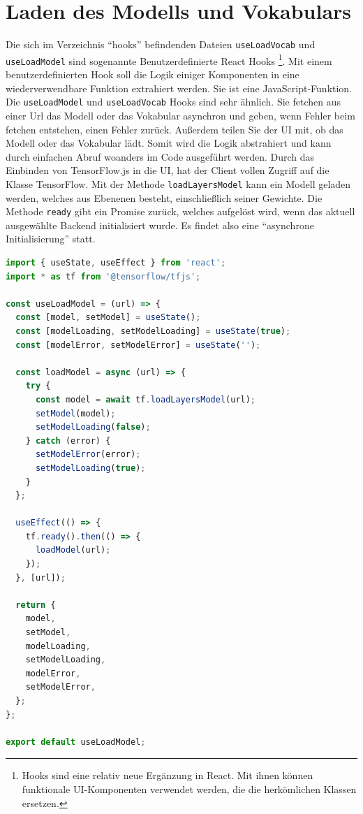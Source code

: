 \section{Laden des Modells und Vokabulars}
Die sich im Verzeichnis \enquote{hooks} befindenden Dateien \texttt{useLoadVocab} und \texttt{useLoadModel} sind sogenannte Benutzerdefinierte React Hooks \footnote{Hooks sind eine relativ neue Ergänzung in React. Mit ihnen können funktionale UI-Komponenten verwendet werden, die die herkömlichen Klassen ersetzen.}. Mit einem benutzerdefinierten Hook soll die Logik einiger Komponenten in eine wiederverwendbare Funktion extrahiert werden. Sie ist eine JavaScript-Funktion. Die \texttt{useLoadModel} und \texttt{useLoadVocab} Hooks sind sehr ähnlich. Sie fetchen aus einer Url das Modell oder das Vokabular asynchron und geben, wenn Fehler beim fetchen entstehen, einen Fehler zurück. Außerdem teilen Sie der UI mit, ob das Modell oder das Vokabular lädt. Somit wird die Logik abstrahiert und kann durch einfachen Abruf woanders im Code ausgeführt werden. Durch das Einbinden von TensorFlow.js in die UI, hat der Client vollen Zugriff auf die Klasse TensorFlow. Mit der Methode \texttt{loadLayersModel} kann ein Modell geladen werden, welches aus Ebenenen besteht, einschließlich seiner Gewichte. Die Methode \texttt{ready} gibt ein Promise zurück, welches aufgelöst wird, wenn das aktuell ausgewählte Backend initialisiert wurde. Es findet also eine \enquote{asynchrone Initialisierung} statt.


\begin{lstlisting}[language=JavaScript, caption=Das useLoadModel Hook, label={useLoadModel}]
import { useState, useEffect } from 'react';
import * as tf from '@tensorflow/tfjs';

const useLoadModel = (url) => {
  const [model, setModel] = useState();
  const [modelLoading, setModelLoading] = useState(true);
  const [modelError, setModelError] = useState('');
  
  const loadModel = async (url) => {
    try {
      const model = await tf.loadLayersModel(url);
      setModel(model);
      setModelLoading(false);
    } catch (error) {
      setModelError(error);
      setModelLoading(true);
    }
  };

  useEffect(() => {
    tf.ready().then(() => {
      loadModel(url);
    });
  }, [url]);

  return {
    model,
    setModel,
    modelLoading,
    setModelLoading,
    modelError,
    setModelError,
  };
};

export default useLoadModel;
\end{lstlisting}

